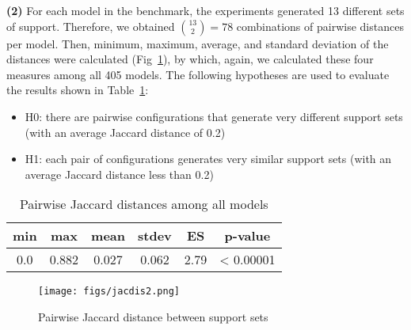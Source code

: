 \textbf{(2)} For each model in the benchmark, the experiments generated 13 different sets of support. Therefore, we obtained $\binom{13}{2} = 78$ combinations of pairwise distances per model. Then, minimum, maximum, average, and standard deviation of the distances were calculated (Fig~\ref{fig:jacdis}), by which, again, we calculated these four measures among all 405 models. The following hypotheses are used to evaluate the results shown in Table~\ref{tab:78com}:
\begin{itemize}
  \item H0: there are pairwise configurations that generate very different support sets (with an average Jaccard distance of 0.2)
  \item H1: each pair of configurations generates very similar support sets (with an average Jaccard distance less than 0.2)
\end{itemize}

\begin{table}
  \centering
  \begin{tabular}{ |c|c|c|c|c|c| }
    \hline
     min & max & mean & stdev & ES & p-value\\[0.5ex]
    \hline
     0.0   & 0.882 & 0.027 & 0.062 & 2.79 & < 0.00001 \\[0.5ex]
    \hline
  \end{tabular}
  \caption{Pairwise Jaccard distances among all models}
  \label{tab:78com}
\end{table}


\begin{figure}
  \centering
  \texttt{[image: figs/jacdis2.png]}
  \caption{Pairwise Jaccard distance between support sets}\label{fig:jacdis}
\end{figure}


